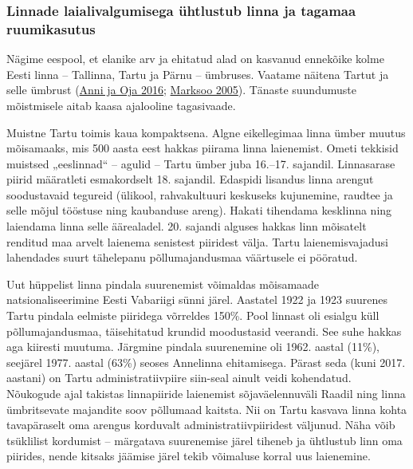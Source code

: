 \documentclass[estonian,]{article}
\begin{document}
\hypertarget{linnade-laialivalgumisega-uxfchtlustub-linna-ja-tagamaa-ruumikasutus}{%
\subsubsection*{Linnade laialivalgumisega ühtlustub linna ja tagamaa ruumikasutus}\label{linnade-laialivalgumisega-uxfchtlustub-linna-ja-tagamaa-ruumikasutus}}

Nägime eespool, et elanike arv ja ehitatud alad on kasvanud ennekõike kolme Eesti linna -- Tallinna, Tartu ja Pärnu -- ümbruses. Vaatame näitena Tartut ja selle ümbrust (\protect\hyperlink{Anni2016}{Anni ja Oja 2016}; \protect\hyperlink{Marksoo2005}{Marksoo 2005}). Tänaste suundumuste mõistmisele aitab kaasa ajalooline tagasivaade.

Muistne Tartu toimis kaua kompaktsena. Algne eikellegimaa linna ümber muutus mõisamaaks, mis 500 aasta eest hakkas piirama linna laienemist. Ometi tekkisid muistsed „eeslinnad`` -- agulid -- Tartu ümber juba 16.--17. sajandil. Linnasarase piirid määratleti esmakordselt 18. sajandil. Edaspidi lisandus linna arengut soodustavaid tegureid (ülikool, rahvakultuuri keskuseks kujunemine, raudtee ja selle mõjul tööstuse ning kaubanduse areng). Hakati tihendama kesklinna ning laiendama linna selle äärealadel. 20. sajandi alguses hakkas linn mõisatelt renditud maa arvelt laienema senistest piiridest välja. Tartu laienemisvajadusi lahendades suurt tähelepanu põllumajandusmaa väärtusele ei pööratud.

Uut hüppelist linna pindala suurenemist võimaldas mõisamaade natsionaliseerimine Eesti Vabariigi sünni järel. Aastatel 1922 ja 1923 suurenes Tartu pindala eelmiste piiridega võrreldes 150\%. Pool linnast oli esialgu küll põllumajandusmaa, täisehitatud krundid moodustasid veerandi. See suhe hakkas aga kiiresti muutuma. Järgmine pindala suurenemine oli 1962. aastal (11\%), seejärel 1977. aastal (63\%) seoses Annelinna ehitamisega. Pärast seda (kuni 2017. aastani) on Tartu administratiivpiire siin-seal ainult veidi kohendatud. Nõukogude ajal takistas linnapiiride laienemist sõjaväelennuväli Raadil ning linna ümbritsevate majandite soov põllumaad kaitsta. Nii on Tartu kasvava linna kohta tavapäraselt oma arengus korduvalt administratiivpiiridest väljunud. Näha võib tsüklilist kordumist -- märgatava suurenemise järel tiheneb ja ühtlustub linn oma piirides, nende kitsaks jäämise järel tekib võimaluse korral uus laienemine.
\end{document}
